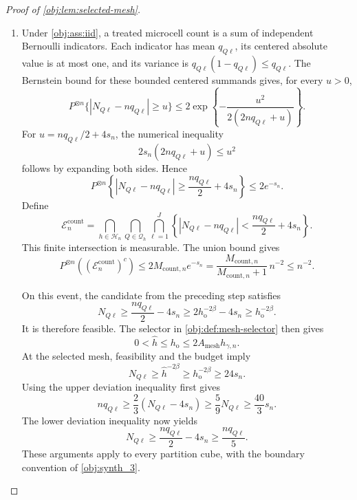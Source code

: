 \documentclass[11pt]{article}
\begin{document}
\begin{proof}[Proof of \cref{obj:lem:selected-mesh}]
\begin{enumerate}
Finally, the oracle balance identity is
\[
nh_{\gamma,n}^{2\beta+D_\gamma}=1.
\]
Thus every microcell at \(h_{\mathrm{o}}\) satisfies
\[
\begin{aligned}
nq_{Q\ell}h_{\mathrm{o}}^{2\beta}
&\ge n\kappa_*h_{\mathrm{o}}^{2\beta+D_\gamma}\\
&\ge
\kappa_*A_{\mathrm{mesh}}^{2\beta+D_\gamma}
nh_{\gamma,n}^{2\beta+D_\gamma}
\ge4,
\end{aligned}
\]
or equivalently \(nq_{Q\ell}\ge4h_{\mathrm{o}}^{-2\beta}\).

\item Under \cref{obj:ass:iid}, a treated microcell count is a sum of
independent Bernoulli indicators. Each indicator has mean \(q_{Q\ell}\),
its centered absolute value is at most one, and its variance is
\(q_{Q\ell}(1-q_{Q\ell})\le q_{Q\ell}\). The Bernstein bound for these
bounded centered summands gives, for every \(u>0\),
\[
P^{\otimes n}\{|N_{Q\ell}-nq_{Q\ell}|\ge u\}
\le
2\exp\!\left\{-\frac{u^2}{2(2nq_{Q\ell}+u)}\right\}.
\]
For \(u=nq_{Q\ell}/2+4s_n\), the numerical inequality
\[
2s_n\left(2nq_{Q\ell}+u\right)\le u^2
\]
follows by expanding both sides. Hence
\[
P^{\otimes n}\left\{
|N_{Q\ell}-nq_{Q\ell}|
\ge\frac{nq_{Q\ell}}2+4s_n
\right\}\le2e^{-s_n}.
\]
Define
\[
\mathcal E_n^{\mathrm{count}}
=
\bigcap_{h\in\mathcal H_n}
\bigcap_{Q\in\mathcal Q_h}
\bigcap_{\ell=1}^{J}
\left\{
|N_{Q\ell}-nq_{Q\ell}|
<\frac{nq_{Q\ell}}2+4s_n
\right\}.
\]
This finite intersection is measurable. The union bound gives
\[
P^{\otimes n}\!\left((\mathcal E_n^{\mathrm{count}})^c\right)
\le2M_{\mathrm{count},n}e^{-s_n}
=
\frac{M_{\mathrm{count},n}}{M_{\mathrm{count},n}+1}\,n^{-2}
\le n^{-2}.
\]

On this event, the candidate from the preceding step satisfies
\[
N_{Q\ell}
\ge\frac{nq_{Q\ell}}2-4s_n
\ge2h_{\mathrm{o}}^{-2\beta}-4s_n
\ge h_{\mathrm{o}}^{-2\beta}.
\]
It is therefore feasible. The selector in \cref{obj:def:mesh-selector}
then gives
\[
0<\widehat h\le h_{\mathrm{o}}
\le2A_{\mathrm{mesh}}h_{\gamma,n}.
\]
At the selected mesh, feasibility and the budget imply
\[
N_{Q\ell}\ge\widehat h^{-2\beta}
\ge h_{\mathrm{o}}^{-2\beta}\ge24s_n.
\]
Using the upper deviation inequality first gives
\[
nq_{Q\ell}
\ge\frac23(N_{Q\ell}-4s_n)
\ge\frac59N_{Q\ell}
\ge\frac{40}{3}s_n.
\]
The lower deviation inequality now yields
\[
N_{Q\ell}
\ge\frac{nq_{Q\ell}}2-4s_n
\ge\frac{nq_{Q\ell}}5.
\]
These arguments apply to every partition cube, with the boundary
convention of \cref{obj:synth_3}.


\end{enumerate}
\end{proof}
\end{document}
